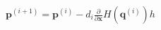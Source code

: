 \documentclass[preview]{standalone}
\begin{document}
\begin{align*}
\mathbf p^{(i+1)}=\mathbf p^{(i)}-d_i\frac{\partial}{\partial\mathbf x}H(\mathbf q^{(i)})h
\end{align*}
\end{document}

